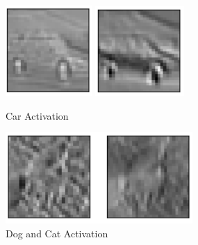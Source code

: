 \documentclass[10pt,twocolumn,letterpaper]{article}
\begin{document}
\begin{figure}
   \begin{center}
      \includegraphics[width=0.3\linewidth]{car.PNG}
      \includegraphics[width=0.3\linewidth]{car2.PNG}
   \end{center}
      \caption{Car Activation\label{fifth_figure}}
    \begin{center}
      \includegraphics[width=0.6\linewidth]{cat_dog.PNG}
    \end{center}
      \caption{Dog and Cat Activation\label{sixth_figure}}
    
\end{figure}
\end{document}
